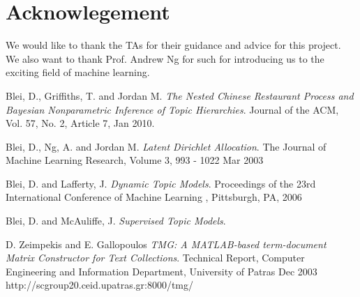 \documentclass[DIV=calc, paper=a4, fontsize=11pt, twocolumn]{scrartcl}	 %
\begin{document}
\section*{Acknowlegement}
We would like to thank the TAs for their guidance and advice for this project. We also want to thank Prof. Andrew Ng for such for introducing us to the exciting field of machine learning.  

\begin{thebibliography}{99}

  Blei, D., Griffiths, T. and Jordan M.
  \emph{The Nested Chinese Restaurant Process and Bayesian Nonparametric Inference of Topic Hierarchies}.
  Journal of the ACM, Vol. 57, No. 2, Article 7,
 Jan 2010.
 
  Blei, D., Ng, A. and Jordan M.
  \emph{Latent Dirichlet Allocation}.
  The Journal of Machine Learning Research,
 Volume 3, 993 - 1022
 Mar 2003
 
  Blei, D. and Lafferty, J.
  \emph{Dynamic Topic Models}.
  Proceedings of the 23rd International Conference of Machine Learning ,
 Pittsburgh, PA,
 2006
 
  Blei, D. and McAuliffe, J.
  \emph{Supervised Topic Models}.
 
  D. Zeimpekis and E. Gallopoulos
  \emph{TMG: A MATLAB-based term-document Matrix Constructor for Text Collections}.
  Technical Report, Computer Engineering and Information Department, University of Patras
  Dec 2003
  http://scgroup20.ceid.upatras.gr:8000/tmg/

\end{thebibliography}
\end{document}
